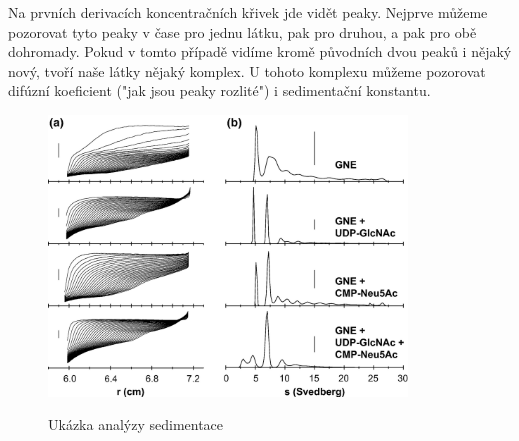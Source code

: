 \documentclass[DIV=8]{scrreprt}
\begin{document}
Na prvních derivacích koncentračních křivek jde vidět peaky. Nejprve můžeme pozorovat tyto peaky v čase pro jednu látku, pak pro druhou, a pak pro obě dohromady. Pokud v tomto případě vidíme kromě původních dvou peaků i nějaký nový, tvoří naše látky nějaký komplex. U tohoto komplexu můžeme pozorovat difúzní koeficient ("jak jsou peaky rozlité") i sedimentační konstantu.

\begin{figure}
    \caption{Ukázka analýzy sedimentace}
    \includegraphics[width=0.85\textwidth]{sedimentation.jpg}
    \centering
    \label{}
\end{figure}
\end{document}
